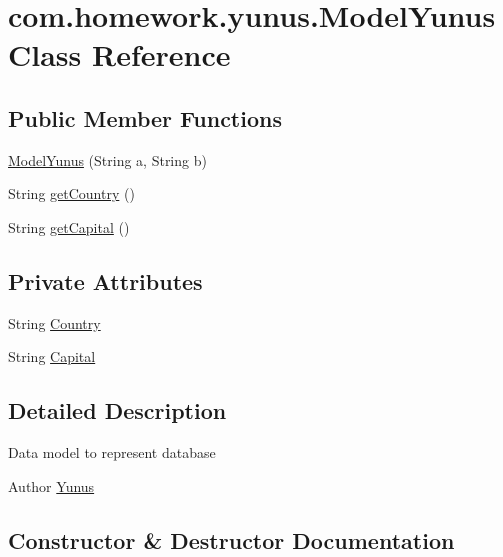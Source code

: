 \hypertarget{classcom_1_1homework_1_1yunus_1_1_model_yunus}{}\section{com.\+homework.\+yunus.\+Model\+Yunus Class Reference}
\label{classcom_1_1homework_1_1yunus_1_1_model_yunus}
\subsection*{Public Member Functions}
\begin{DoxyCompactItemize}
\item 
\hyperlink{classcom_1_1homework_1_1yunus_1_1_model_yunus_a8892831477618db232c3e7e3dfbb83fc}{Model\+Yunus} (String a, String b)
\item 
String \hyperlink{classcom_1_1homework_1_1yunus_1_1_model_yunus_a249312988eb75b2506a26b76435cd3e9}{get\+Country} ()
\item 
String \hyperlink{classcom_1_1homework_1_1yunus_1_1_model_yunus_afdae42e7bc6c2426643bf4a43a3ddc43}{get\+Capital} ()
\end{DoxyCompactItemize}
\subsection*{Private Attributes}
\begin{DoxyCompactItemize}
\item 
String \hyperlink{classcom_1_1homework_1_1yunus_1_1_model_yunus_a8ce3fed48e238b186be6f221e1c330a0}{Country}
\item 
String \hyperlink{classcom_1_1homework_1_1yunus_1_1_model_yunus_a018b7c53abd3d00a1cf6115add99a4c1}{Capital}
\end{DoxyCompactItemize}


\subsection{Detailed Description}
Data model to represent database \begin{DoxyAuthor}{Author}
\hyperlink{classcom_1_1homework_1_1yunus_1_1_yunus}{Yunus} 
\end{DoxyAuthor}


\subsection{Constructor \& Destructor Documentation}
